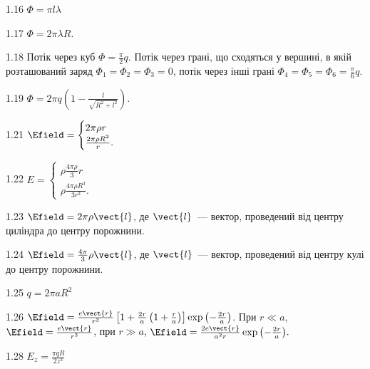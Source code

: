 \begin{Solution}{1.{16}}
	$\Phi = \pi l \lambda$
\end{Solution}
\begin{Solution}{1.{17}}
	$\Phi = 2\pi\lambda R$.
\end{Solution}
\begin{Solution}{1.{18}}
	Потік через куб $\Phi = \frac{\pi}{2}q$. Потік через грані, що сходяться у вершині, в якій розташований заряд $\Phi_1 = \Phi_2 =\Phi_3 = 0$, потік через інші грані $\Phi_4 = \Phi_5 =\Phi_6 = \frac{\pi}{6}q$.
\end{Solution}
\begin{Solution}{1.{19}}
	$\Phi = 2\pi q\left( 1 - \frac{l}{\sqrt{R^2 + l^2}}\right) $.
\end{Solution}
\begin{Solution}{1.{21}}
	$\Efield =
		\begin{cases}
			2\pi\rho r\\
			\frac{2\pi\rho R^2}{r}.
		\end{cases}
	$
\end{Solution}
\begin{Solution}{1.{22}}
	$E =
		\begin{cases}
			\rho\frac{4\pi\rho}{3}r\\
			\rho\frac{4\pi\rho R^3}{3 r^2}.
		\end{cases}
	$
\end{Solution}
\begin{Solution}{1.{23}}
	$\Efield = 2\pi\rho \vect{l}$, де $\vect{l}$~--- вектор, проведений від центру циліндра до центру порожнини.
\end{Solution}
\begin{Solution}{1.{24}}
	$\Efield = \frac{4\pi}{3}\rho \vect{l}$, де $\vect{l}$~--- вектор, проведений від центру кулі до центру порожнини.
\end{Solution}
\begin{Solution}{1.{25}}
	$q = 2\pi a R^2$
\end{Solution}
\begin{Solution}{1.{26}}
	$\Efield = \frac{e\vect{r}}{r^3} \left[ 1 + \frac{2r}{a} \left( 1 + \frac{r}{a} \right) \right]\exp{\left( -\frac{2r}{a}\right) }$. При $r\ll a$, $\Efield = \frac{e\vect{r}}{r^3}$, при $r \gg a$, $\Efield = \frac{2e\vect{r}}{a^2r}\exp{\left( -\frac{2r}{a}\right) }.$
\end{Solution}
\begin{Solution}{1.{28}}
	$E_z = \frac{\pi qR}{2z^3}$
\end{Solution}
